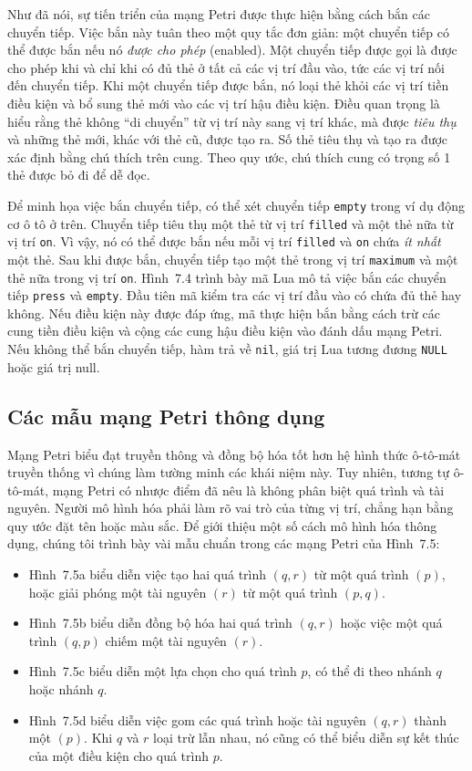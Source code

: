 Như đã nói, sự tiến triển của mạng Petri được thực hiện bằng cách bắn các chuyển tiếp. Việc bắn này tuân theo một quy tắc đơn giản: một chuyển tiếp có thể được bắn nếu nó \emph{được cho phép} (enabled). Một chuyển tiếp được gọi là được cho phép khi và chỉ khi có đủ thẻ ở tất cả các vị trí đầu vào, tức các vị trí nối đến chuyển tiếp. Khi một chuyển tiếp được bắn, nó loại thẻ khỏi các vị trí tiền điều kiện và bổ sung thẻ mới vào các vị trí hậu điều kiện. Điều quan trọng là hiểu rằng thẻ không ``di chuyển'' từ vị trí này sang vị trí khác, mà được \emph{tiêu thụ} và những thẻ mới, khác với thẻ cũ, được tạo ra. Số thẻ tiêu thụ và tạo ra được xác định bằng chú thích trên cung. Theo quy ước, chú thích cung có trọng số 1 thẻ được bỏ đi để dễ đọc.

Để minh họa việc bắn chuyển tiếp, có thể xét chuyển tiếp \texttt{empty} trong ví dụ động cơ ô tô ở trên. Chuyển tiếp tiêu thụ một thẻ từ vị trí \texttt{filled} và một thẻ nữa từ vị trí \texttt{on}. Vì vậy, nó có thể được bắn nếu mỗi vị trí \texttt{filled} và \texttt{on} chứa \emph{ít nhất} một thẻ. Sau khi được bắn, chuyển tiếp tạo một thẻ trong vị trí \texttt{maximum} và một thẻ nữa trong vị trí \texttt{on}. Hình~7.4 trình bày mã Lua mô tả việc bắn các chuyển tiếp \texttt{press} và \texttt{empty}. Đầu tiên mã kiểm tra các vị trí đầu vào có chứa đủ thẻ hay không. Nếu điều kiện này được đáp ứng, mã thực hiện bắn bằng cách trừ các cung tiền điều kiện và cộng các cung hậu điều kiện vào đánh dấu mạng Petri. Nếu không thể bắn chuyển tiếp, hàm trả về \texttt{nil}, giá trị Lua tương đương \texttt{NULL} hoặc giá trị null.

\subsection{Các mẫu mạng Petri thông dụng}
Mạng Petri biểu đạt truyền thông và đồng bộ hóa tốt hơn hệ hình thức ô-tô-mát truyền thống vì chúng làm tường minh các khái niệm này. Tuy nhiên, tương tự ô-tô-mát, mạng Petri có nhược điểm đã nêu là không phân biệt quá trình và tài nguyên. Người mô hình hóa phải làm rõ vai trò của từng vị trí, chẳng hạn bằng quy ước đặt tên hoặc màu sắc. Để giới thiệu một số cách mô hình hóa thông dụng, chúng tôi trình bày vài mẫu chuẩn trong các mạng Petri của Hình~7.5:
\begin{itemize}
\item Hình~7.5a biểu diễn việc tạo hai quá trình $(q,r)$ từ một quá trình $(p)$, hoặc giải phóng một tài nguyên $(r)$ từ một quá trình $(p,q)$.
\item Hình~7.5b biểu diễn đồng bộ hóa hai quá trình $(q,r)$ hoặc việc một quá trình $(q,p)$ chiếm một tài nguyên $(r)$.
\item Hình~7.5c biểu diễn một lựa chọn cho quá trình $p$, có thể đi theo nhánh $q$ hoặc nhánh $q$.
\item Hình~7.5d biểu diễn việc gom các quá trình hoặc tài nguyên $(q,r)$ thành một $(p)$. Khi $q$ và $r$ loại trừ lẫn nhau, nó cũng có thể biểu diễn sự kết thúc của một điều kiện cho quá trình $p$.
\end{itemize}

